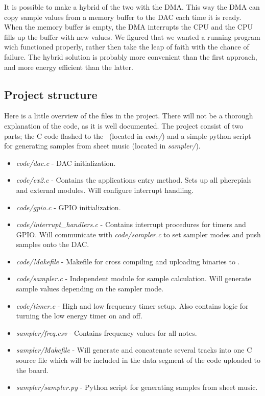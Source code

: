 It is possible to make a hybrid of the two with the DMA. This way the DMA can copy sample values from a memory buffer to the DAC each time it is ready. When the memory buffer is empty, the DMA interrupts the CPU and the CPU fills up the buffer with new values. We figured that we wanted a running program wich functioned properly, rather then take the leap of faith with the chance of failure. The hybrid solution is probably more convenient than the first approach, and more energy efficient than the latter.  


\subsection{Project structure}
Here is a little overview of the files in the project. There will not be a thorough explanation of the code, as it is well documented. The project consist of two parts; the C code flashed to the \boardName\ (located in \emph{code/}) and a simple python script for generating samples from sheet music (located in \emph{sampler/}).

\begin{itemize}
	\item \emph{code/dac.c} - DAC initialization.
	\item \emph{code/ex2.c} - Contains the applications entry method. Sets up all pherepials and external modules. Will configure interrupt handling.
	\item \emph{code/gpio.c} - GPIO initialization.
	\item \emph{code/interrupt\_handlers.c} - Contains interrupt procedures for timers and GPIO. Will communicate with \emph{code/sampler.c} to set sampler modes and push samples onto the DAC.
	\item \emph{code/Makefile} - Makefile for cross compiling and uploading binaries to \boardName .
	\item \emph{code/sampler.c} - Independent module for sample calculation. Will generate sample values depending on the sampler mode.
	\item \emph{code/timer.c} - High and low frequency timer setup. Also contains logic for turning the low energy timer on and off.
	\item \emph{sampler/freq.csv} - Contains frequency values for all notes.
	\item \emph{sampler/Makefile} - Will generate and concatenate several tracks into one C source file which will be included in the data segment of the code uploaded to the board.
	\item \emph{sampler/sampler.py} - Python script for generating samples from sheet music.
\end{itemize}

